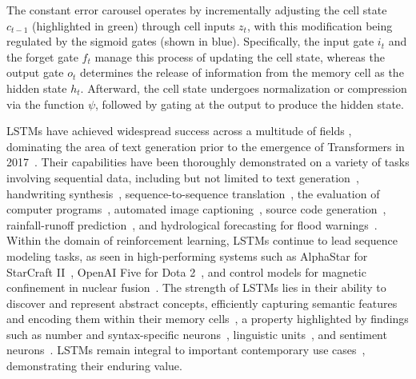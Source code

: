 The constant error carousel operates by incrementally adjusting the cell state $c_{t-1}$ (highlighted in green) through cell inputs $z_t$, with this modification being regulated by the sigmoid gates (shown in blue). Specifically, the input gate $i_t$ and the forget gate $f_t$ manage this process of updating the cell state, whereas the output gate $o_t$ determines the release of information from the memory cell as the hidden state $h_t$. Afterward, the cell state undergoes normalization or compression via the function $\psi$, followed by gating at the output to produce the hidden state.

LSTMs have achieved widespread success across a multitude of fields \citep{Hochreiter:01,Hochreiter:07,Schmidhuber:15}, dominating the area of text generation prior to the emergence of Transformers in 2017~\citep{Vaswani:17}. Their capabilities have been thoroughly demonstrated on a variety of tasks involving sequential data, including but not limited to text generation~\citep{Graves:13,Karpathy:15blog}, handwriting synthesis~\citep{Graves:13}, sequence-to-sequence translation~\citep{Sutskever:14nips}, the evaluation of computer programs~\citep{Zaremba:14arxiv}, automated image captioning~\citep{Karpathy:15,Hossain:19}, source code generation~\citep{Karpathy:15blog}, rainfall-runoff prediction~\citep{Kratzert:18,Kratzert:19}, and hydrological forecasting for flood warnings~\citep{Nearing:24}. Within the domain of reinforcement learning, LSTMs continue to lead sequence modeling tasks, as seen in high-performing systems such as AlphaStar for StarCraft II~\citep{Vinyals:17short}, OpenAI Five for Dota 2~\citep{OpenAI:19}, and control models for magnetic confinement in nuclear fusion~\citep{Degrave:22short}. The strength of LSTMs lies in their ability to discover and represent abstract concepts, efficiently capturing semantic features and encoding them within their memory cells~\citep{Karpathy:15blog}, a property highlighted by findings such as number and syntax-specific neurons~\citep{Lakretz:19}, linguistic units~\citep{Bau:19}, and sentiment neurons~\citep{Radford:17arxiv}. LSTMs remain integral to important contemporary use cases~\citep{Degrave:22short,Nearing:24}, demonstrating their enduring value.

